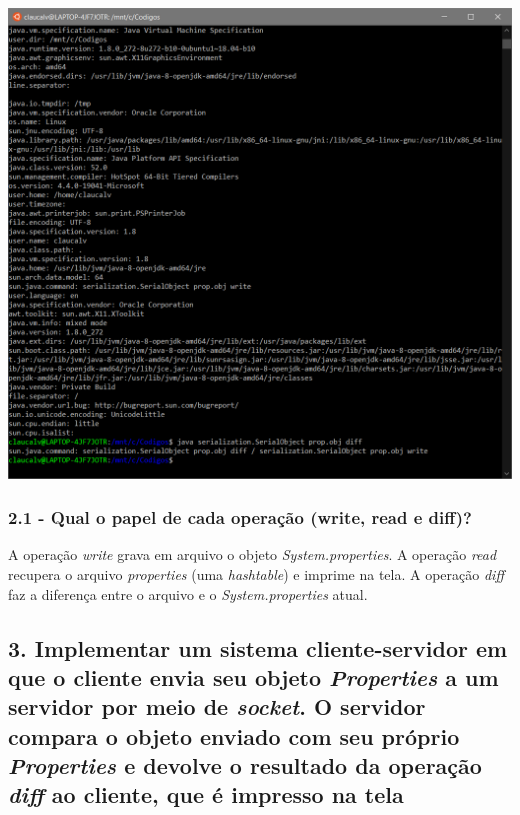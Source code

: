 \begin{minipage}{\textwidth}
    \hspace{1em}
    \includegraphics[scale=.35]{prints/serial3.PNG}
    \label{threadspng}
    \hspace{1em}
\end{minipage}
\vspace{0.5em}

\subsubsection{2.1 - Qual o papel de cada operação (write, read e diff)?}

A operação \textit{write} grava em arquivo o objeto \textit{System.properties}. A operação \textit{read} recupera o arquivo \textit{properties} (uma \textit{hashtable}) e imprime na tela. A operação \textit{diff} faz a diferença entre o arquivo e o \textit{System.properties} atual.

\subsection*{3. Implementar um sistema cliente-servidor em que o cliente envia seu objeto \textit{Properties} a um servidor por meio de \textit{socket}. O servidor compara o objeto enviado com seu próprio \textit{Properties} e devolve o resultado da operação \textit{diff} ao cliente, que é impresso na tela}

